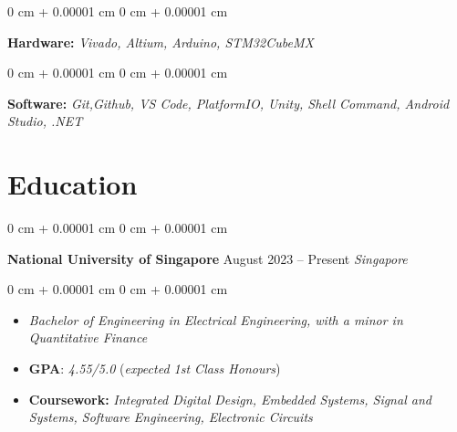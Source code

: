 \documentclass[10pt, letterpaper]{article}
\newenvironment{highlights}{
    \begin{itemize}[
        topsep=0.10 cm,
        parsep=0.10 cm,
        partopsep=0pt,
        itemsep=0pt,
        leftmargin=0 cm + 10pt
    ]
}{
    \end{itemize}
} %
\newenvironment{onecolentry}{
    \begin{adjustwidth}{
        0 cm + 0.00001 cm
    }{
        0 cm + 0.00001 cm
    }
}{
    \end{adjustwidth}
} %
\newenvironment{twocolentry}[2][]{
    \onecolentry
    \def\secondColumn{#2}
    \setcolumnwidth{\fill, 4.5 cm}
    \begin{paracol}{2}
}{
    \switchcolumn \raggedleft \secondColumn
    \end{paracol}
    \endonecolentry
} %
\begin{document}
         \vspace{0.1 cm}

        \begin{onecolentry}
            \textbf{Hardware:} \textit{Vivado, Altium, Arduino, STM32CubeMX } \end{onecolentry}

        \vspace{0.1 cm}

         \begin{onecolentry}
            \textbf{Software:}\textit{ Git,Github, VS Code, PlatformIO, Unity, Shell Command, Android Studio, .NET}  \end{onecolentry}

  \section{Education}

  
        \begin{twocolentry}{
            August 2023 – Present
            \textit{Singapore}
        }
            \textbf{National University of Singapore}\end{twocolentry}
            \vspace{0.10cm}
            
        \vspace{0.10 cm}
        \begin{onecolentry}
            \begin{highlights}
            \item \textit{Bachelor of Engineering in Electrical Engineering, with a minor in Quantitative Finance}
                \item \textbf{GPA}: \textit{4.55/5.0} (\textit{expected 1st Class Honours})
                \item \textbf{Coursework:}\textit{ Integrated Digital Design, Embedded Systems, Signal and Systems, Software Engineering, Electronic Circuits }
            \end{highlights}
        \end{onecolentry}
        


    
\end{document}
